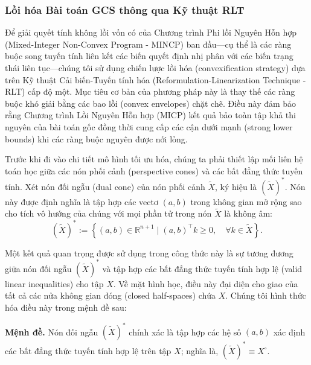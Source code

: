 \subsubsection{Lồi hóa Bài toán GCS thông qua Kỹ thuật RLT}

Để giải quyết tính không lồi vốn có của Chương trình Phi lồi Nguyên Hỗn hợp (Mixed-Integer Non-Convex Program - MINCP) ban đầu—cụ thể là các ràng buộc song tuyến tính liên kết các biến quyết định nhị phân với các biến trạng thái liên tục—chúng tôi sử dụng chiến lược lồi hóa (convexification strategy) dựa trên Kỹ thuật Cải biến-Tuyến tính hóa (Reformulation-Linearization Technique - RLT) cấp độ một. Mục tiêu cơ bản của phương pháp này là thay thế các ràng buộc khó giải bằng các bao lồi (convex envelopes) chặt chẽ. Điều này đảm bảo rằng Chương trình Lồi Nguyên Hỗn hợp (MICP) kết quả bảo toàn tập khả thi nguyên của bài toán gốc đồng thời cung cấp các cận dưới mạnh (strong lower bounds) khi các ràng buộc nguyên được nới lỏng.


Trước khi đi vào chi tiết mô hình tối ưu hóa, chúng ta phải thiết lập mối liên hệ toán học giữa các nón phối cảnh (perspective cones) và các bất đẳng thức tuyến tính. Xét nón đối ngẫu (dual cone) của nón phối cảnh $\tilde{X}$, ký hiệu là $(\tilde{X})^*$. Nón này được định nghĩa là tập hợp các vectơ $(a, b)$ trong không gian mở rộng sao cho tích vô hướng của chúng với mọi phần tử trong nón $\tilde{X}$ là không âm:
\begin{equation}
    (\tilde{X})^* := \left\{ (a, b) \in \mathbb{R}^{n+1} \mid (a, b)^\top k \ge 0, \quad \forall k \in \tilde{X} \right\}.
\end{equation}

Một kết quả quan trọng được sử dụng trong công thức này là sự tương đương giữa nón đối ngẫu $(\tilde{X})^*$ và tập hợp các bất đẳng thức tuyến tính hợp lệ (valid linear inequalities) cho tập $X$. Về mặt hình học, điều này đại diện cho giao của tất cả các nửa không gian đóng (closed half-spaces) chứa $X$. Chúng tôi hình thức hóa điều này trong mệnh đề sau:

\textbf{Mệnh đề.} Nón đối ngẫu $(\tilde{X})^*$ chính xác là tập hợp các hệ số $(a, b)$ xác định các bất đẳng thức tuyến tính hợp lệ trên tập $X$; nghĩa là, $(\tilde{X})^* \equiv X^\circ$.

